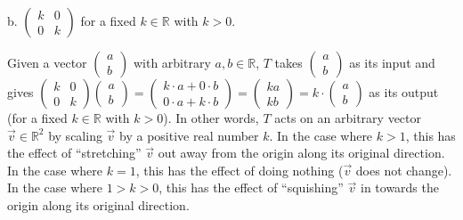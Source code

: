 \documentclass[12pt]{article}
\newenvironment{problem}[2][Problem]
{
	\begin{trivlist} 
		\item[\hskip \labelsep {\bfseries #1 #2:}]
	}
{
	\end{trivlist}
	}
\newenvironment{solution}[1][Solution]
{
	\begin{trivlist} 
		\item[\hskip \labelsep {\itshape #1:}]
	}
	{
	\end{trivlist}
}
\begin{document}
\begin{problem}{4}
\noindent
\newline
\newline
b. $\begin{pmatrix}k&0\\0&k\end{pmatrix}$ for a fixed $k \in \mathbb{R}$ with $k>0$.
\begin{solution}
Given a vector $\begin{pmatrix}a\\b\end{pmatrix}$ with arbitrary $a,b \in \mathbb{R}$, $T$ takes $\begin{pmatrix}a\\b\end{pmatrix}$ as its input and gives $\begin{pmatrix}k&0\\0 & k\end{pmatrix} \begin{pmatrix}a\\b\end{pmatrix}=\begin{pmatrix}k\cdot a+ 0\cdot b\\0\cdot a+k\cdot b\end{pmatrix} = \begin{pmatrix}ka\\kb\end{pmatrix} = k\cdot \begin{pmatrix}a\\b\end{pmatrix}$ as its output (for a fixed $k \in \mathbb{R}$ with $k>0$). In other words, $T$ acts on an arbitrary vector $\vec{v} \in \mathbb{R}^2$ by scaling $\vec{v}$ by a positive real number $k$. In the case where $k>1$, this has the effect of ``stretching'' $\vec{v}$ out away from the origin along its original direction. In the case where $k=1$, this has the effect of doing nothing ($\vec{v}$ does not change). In the case where $1>k>0$, this has the effect of ``squishing'' $\vec{v}$ in towards the origin along its original direction.
\end{solution}


\end{problem}
\end{document}
